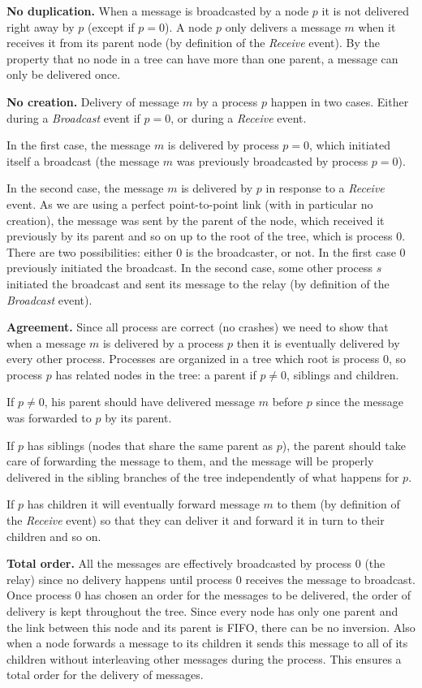 \documentclass[a4paper]{article}
\begin{document}
\bigskip
\noindent\textbf{No duplication.} When a message is broadcasted by a node $p$
it is not delivered right away by $p$ (except if $p = 0$). A node $p$ only
delivers a message $m$ when it receives it from its parent node (by definition
of the \textit{Receive} event). By the property that no node in a tree can
have more than one parent, a message can only be delivered once.

\bigskip
\noindent\textbf{No creation.} Delivery of message $m$ by a process $p$ happen
in two cases. Either during a \textit{Broadcast} event if $p=0$, or during a
\textit{Receive} event.

In the first case, the message $m$ is delivered by process $p=0$, which
initiated itself a broadcast (the message $m$ was previously  broadcasted by
process $p=0$).

In the second case, the message $m$ is delivered by $p$ in response to a
\textit{Receive} event. As we are using a perfect point-to-point link (with in
particular no creation), the message was sent by the parent of the node, which
received it previously by its parent and so on up to the root of the tree, which
is process $0$. There are two possibilities: either $0$ is the broadcaster, or
not. In the first case $0$ previously initiated the broadcast. In the second
case, some other process $s$ initiated the broadcast and sent its message to
the relay (by definition of the \textit{Broadcast} event).

\bigskip
\noindent\textbf{Agreement.} Since all process are correct (no crashes) we need
to show that when a message $m$ is delivered by a process $p$ then it is
eventually delivered by every other process. Processes are organized in a tree
which root is process $0$, so process $p$ has related nodes in the tree: a
parent if $p \neq 0$, siblings and children.

If $p \neq 0$, his parent should have delivered message $m$ before $p$ since
the message was forwarded to $p$ by its parent.

If $p$ has siblings (nodes that share the same parent as $p$), the parent
should take care of forwarding the message to them, and the message will be
properly delivered in the sibling branches of the tree independently of what
happens for $p$.

If $p$ has children it will eventually forward message $m$ to them (by
definition of the \textit{Receive} event) so that they can deliver it and
forward it in turn to their children and so on.

\bigskip
\noindent\textbf{Total order.} All the messages are effectively broadcasted by
process $0$ (the relay) since no delivery happens until process $0$ receives
the message to broadcast. Once process $0$ has chosen an order for the
messages to be delivered, the order of delivery is kept throughout the tree.
Since every node has only one parent and the link between this node and its
parent is FIFO, there can be no inversion. Also when a node forwards a message
to its children it sends this message to all of its children without
interleaving other messages during the process. This ensures a total order
for the delivery of messages.
\end{document}
